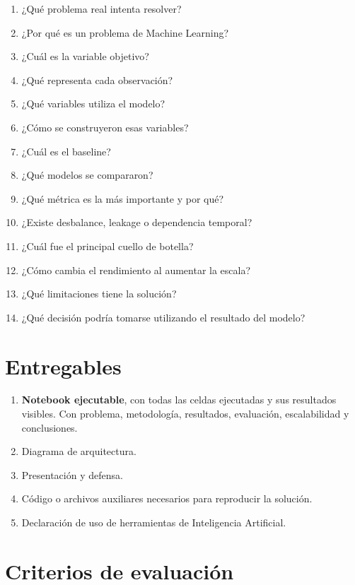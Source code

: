 \documentclass[11pt,a4paper]{article}
\begin{document}
\begin{enumerate}[itemsep=0.55em]
  \item ¿Qué problema real intenta resolver?
  \item ¿Por qué es un problema de Machine Learning?
  \item ¿Cuál es la variable objetivo?
  \item ¿Qué representa cada observación?
  \item ¿Qué variables utiliza el modelo?
  \item ¿Cómo se construyeron esas variables?
  \item ¿Cuál es el baseline?
  \item ¿Qué modelos se compararon?
  \item ¿Qué métrica es la más importante y por qué?
  \item ¿Existe desbalance, leakage o dependencia temporal?
  \item ¿Cuál fue el principal cuello de botella?
  \item ¿Cómo cambia el rendimiento al aumentar la escala?
  \item ¿Qué limitaciones tiene la solución?
  \item ¿Qué decisión podría tomarse utilizando el resultado del modelo?
\end{enumerate}

\section{Entregables}

\begin{enumerate}[itemsep=0.55em]
  \item \textbf{Notebook ejecutable}, con todas las celdas ejecutadas y sus resultados
        visibles. Con problema, metodología, resultados, evaluación, escalabilidad y
        conclusiones.
  \item Diagrama de arquitectura.
  \item Presentación y defensa.
  \item Código o archivos auxiliares necesarios para reproducir la solución.
  \item Declaración de uso de herramientas de Inteligencia Artificial.
\end{enumerate}

\section{Criterios de evaluación}
\end{document}
